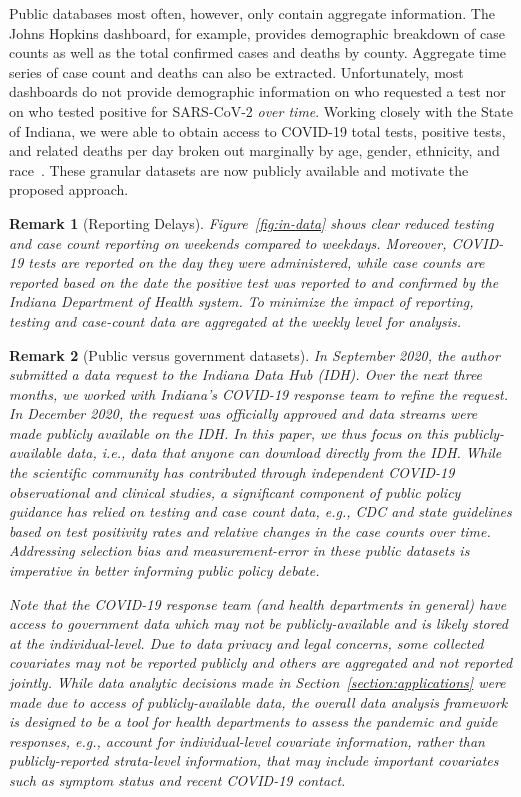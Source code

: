 \documentclass[11pt]{amsart}
\numberwithin{equation}{section}
\theoremstyle{plain}
\newtheorem{remark}{Remark}
\begin{document}
 Public databases most often, however, only contain aggregate information.  The Johns Hopkins dashboard, for example, provides demographic breakdown of case counts as well as the total confirmed cases and deaths by county.  Aggregate time series of case count and deaths can also be extracted.  Unfortunately, most dashboards do not provide demographic information on who requested a test nor on who tested positive for SARS-CoV-2 \emph{over time}. Working closely with the State of Indiana, we were able to obtain access to COVID-19 total tests, positive tests, and related deaths per day broken out marginally by age, gender, ethnicity, and race~\citep{IndianaData2021}.  These granular datasets are now publicly available and motivate the proposed approach.

\begin{remark}[Reporting Delays]
Figure~\ref{fig:in-data} shows clear reduced testing and case count reporting on weekends compared to weekdays. Moreover, COVID-19 tests are reported on the day they were administered, while case counts are reported based on the date the positive test was reported to and confirmed by the Indiana Department of Health system.  To minimize the impact of reporting, testing and case-count data are aggregated at the weekly level for analysis.
 \end{remark}

\begin{remark}[Public versus government datasets]
In September 2020, the author submitted a data request to the Indiana Data Hub (IDH).  Over the next three months, we worked with Indiana's COVID-19 response team to refine the request.  In December 2020, the request was officially approved and data streams were made publicly available on the IDH.  In this paper, we thus focus on this \emph{publicly-available data}, i.e., data  that anyone can download directly from the IDH. While the scientific community has contributed through independent COVID-19 observational and clinical studies, a significant component of public policy guidance has relied on testing and case count data, e.g., CDC and state guidelines based on test positivity rates and relative changes in the case counts over time.   Addressing selection bias and measurement-error in these public datasets is imperative in better informing public policy debate.

Note that the COVID-19 response team (and health departments in general) have access to \emph{government data} which may not be publicly-available and is likely stored at the individual-level. Due to data privacy and legal concerns, some collected covariates may not be reported publicly and others are aggregated and not reported jointly.  While data analytic decisions made in Section~\ref{section:applications} were made due to access of publicly-available data, the overall data analysis framework is designed to be a tool for health departments to assess the pandemic and guide responses, e.g.,  account for individual-level covariate information, rather than publicly-reported strata-level information, that may include important covariates such as symptom status and recent COVID-19 contact.
 \end{remark}
\end{document}
